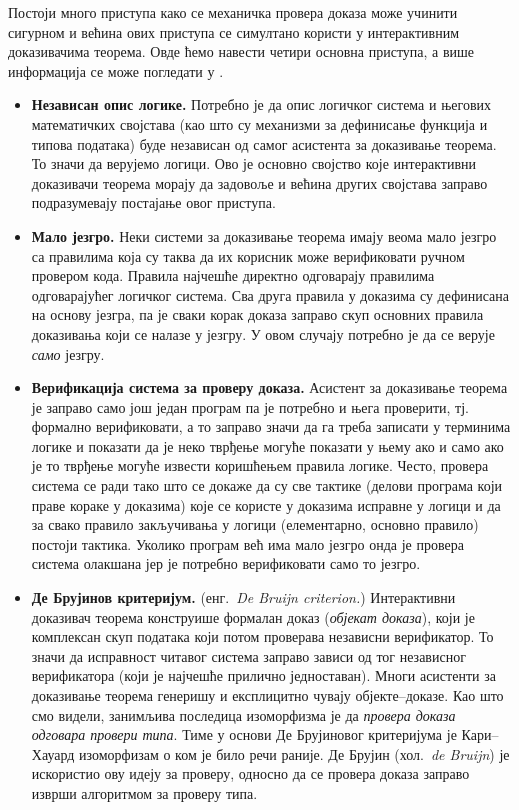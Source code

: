 Постоји много приступа како се механичка провера доказа може учинити
сигурном и већина ових приступа се симултано користи у интерактивним
доказивачима теорема. Овде ћемо навести четири основна приступа, а
више информација се може погледати у \cite{geuvers2009proof}.
\begin{itemize}
\item \textbf{Независан опис логике.} Потребно је да опис логичког
  система и његових математичких својстава (као што су механизми за
  дефинисање функција и типова података) буде независан од самог
  асистента за доказивање теорема. То значи да верујемо логици. Ово је
  основно својство које интерактивни доказивачи теорема морају да
  задовоље и већина других својстава заправо подразумевају постајање
  овог приступа.
\item \textbf{Мало језгро.} Неки системи за доказивање теорема имају
  веома мало језгро са правилима која су таква да их корисник може
  верификовати ручном провером кода. Правила најчешће директно
  одговарају правилима одговарајућег логичког система. Сва друга
  правила у доказима су дефинисана на основу језгра, па је сваки корак
  доказа заправо скуп основних правила доказивања који се налазе у
  језгру. У овом случају потребно је да се верује \emph{само} језгру.
\item \textbf{Верификација система за проверу доказа.} Асистент за
  доказивање теорема је заправо само још један програм па је потребно
  и њега проверити, тј. формално верификовати, а то заправо значи да
  га треба записати у терминима логике и показати да је неко тврђење
  могуће показати у њему ако и само ако је то тврђење могуће извести
  коришћењем правила логике. Често, провера система се ради тако што
  се докаже да су све тактике (делови програма који праве кораке у
  доказима) које се користе у доказима исправне у логици и да за свако
  правило закључивања у логици (елементарно, основно правило) постоји
  тактика. Уколико програм већ има мало језгро онда је провера система
  олакшана јер је потребно верификовати само то језгро.
\item \textbf{Де Брујинов критеријум.} (енг.~\emph{De Bruijn
  criterion.})  Интерактивни доказивач теорема конструише формалан
  доказ (\emph{објекат доказа}), који је комплексан скуп података који
  потом проверава независни верификатор. То значи да исправност
  читавог система заправо зависи од тог независног верификатора (који
  је најчешће прилично једноставан). Многи асистенти за доказивање
  теорема генеришу и експлицитно чувају објекте--доказе. Као што смо
  видели, занимљива последица изоморфизма је да \emph{провера доказа
    одговара провери типа}. Тиме у основи Де Брујиновог критеријума је
  Кари--Хауард изоморфизам о ком је било речи раније. Де Брујин
  (хол.~\emph{de Bruijn}) је искористио ову идеју за проверу, односно
  да се провера доказа заправо изврши алгоритмом за проверу типа.
\end{itemize}

